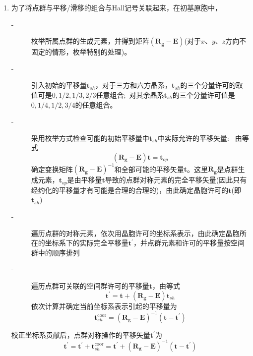 \begin{enumerate}
	\item 为了将点群与平移/滑移的组合与\textrm{Hall}记号关联起来，在初基原胞中，
		\begin{description}
			\item[-] 枚举所属点群的生成元素，并得到矩阵$(\mathbf{R_g}-\mathbf{E})$(对于$x$、$y$、$z$方向不固定的情形，枚举特别的处理)。
			\item[-] 引入初始的平移量$\mathbf{t}_{sh}$，对于三方和六方晶系，$\mathbf{t}_{sh}$的三个分量许可的取值可是$0,1/2,1/3,2/3$任意组合;~对其余晶系$\mathbf{t}_{sh}$的三个分量许可值是$0,1/4,1/2,3/4$的任意组合。
			\item[-]采用枚举方式检查可能的初始平移量中$\mathbf{t}_{sh}$中实际允许的平移矢量:~
				由等式
				\begin{displaymath}
					(\mathbf{R_g}-\mathbf{E})\mathbf{t}=\mathbf{t}_{op}
				\end{displaymath}
确定变换矩阵$(\mathbf{R_g}-\mathbf{E})^{-1}$和全部可能的平移矢量$\mathbf{t}$。这里$\mathbf{R_g}$是点群生成元素，$\mathbf{t}_{op}$是由平移量$\mathbf{t}$导致的点群对称元素的完全平移矢量(因此只有经约化的平移量才有可能是合理的合理的)，由此确定晶胞许可的$\mathbf{t}$(即$\mathbf{t}_{sh}$)
			\item[-] 遍历点群的对称元素，依次用晶胞许可的坐标系表示，由此确定晶胞所在的坐标系下的实际完全平移量$\mathbf{t}^{\prime}$，并点群元素和许可的平移量按空间群中的顺序排列
			\item[-] 遍历点群可关联的空间群许可的平移量$\mathbf{t}$，由等式
		\begin{displaymath}
			\mathbf{t}^{\prime}=\mathbf{t}+(\mathbf{R_g}-\mathbf{E})\mathbf{t}_{sh}
		\end{displaymath}
		依次计算并确定当前坐标系表示引起的平移量为
		\begin{displaymath}
			\mathbf{t}_{sh}^{\mathrm{coor}}=(\mathbf{R_g}-\mathbf{E})^{-1}(\mathbf{t}-\mathbf{t}^{\prime})
		\end{displaymath}
		\end{description}
		校正坐标系贡献后，点群对称操作的平移矢量$\mathbf{t}^{\prime}$为
		\begin{displaymath}
			\mathbf{t}^{\prime}=\mathbf{t}^{\prime}+\mathbf{t}_{sh}^{\mathrm{coor}}=\mathbf{t}^{\prime}+(\mathbf{R_g}-\mathbf{E})^{-1}(\mathbf{t}-\mathbf{t}^{\prime})
		\end{displaymath}


\end{enumerate}
